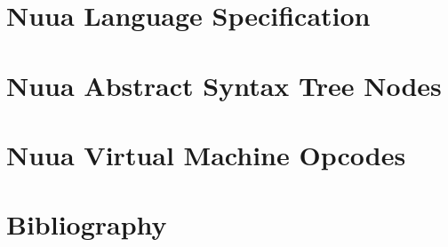 \chapter{Nuua Language Specification}
\label{sec:nuua_spec}


\chapter{Nuua Abstract Syntax Tree Nodes}
\label{sec:tree_nodes}


\chapter{Nuua Virtual Machine Opcodes}
\label{sec:opcodes}


\chapter{Bibliography}
\printbibliography[heading=none]



